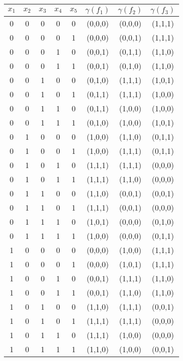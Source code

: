 \documentclass[utf8x, 14pt]{G7-32} %
\begin{document}
\begin{center}   
\begin{tabular} { | c | c | c | c | c | c | c | c | }
\hline
$x_1$ & $x_2$ & $x_3$ & $x_4$ & $x_5$ & $\gamma (f_1)$ & $\gamma (f_2)$ & $\gamma (f_3)$ \\
\hline\hline

0 & 0 & 0 & 0 & 0 & (0,0,0) & (0,0,0) & (1,1,1) \\
\hline
0 & 0 & 0 & 0 & 1 & (0,0,0) & (0,0,1) & (1,1,1) \\
\hline
0 & 0 & 0 & 1 & 0 & (0,0,1) & (0,1,1) & (1,1,0) \\
\hline
0 & 0 & 0 & 1 & 1 & (0,0,1) & (0,1,0) & (1,1,0) \\
\hline
0 & 0 & 1 & 0 & 0 & (0,1,0) & (1,1,1) & (1,0,1) \\
\hline
0 & 0 & 1 & 0 & 1 & (0,1,1) & (1,1,1) & (1,0,0) \\
\hline
0 & 0 & 1 & 1 & 0 & (0,1,1) & (1,0,0) & (1,0,0) \\
\hline
0 & 0 & 1 & 1 & 1 & (0,1,0) & (1,0,0) & (1,0,1) \\
\hline
0 & 1 & 0 & 0 & 0 & (1,0,0) & (1,1,0) & (0,1,1) \\
\hline
0 & 1 & 0 & 0 & 1 & (1,0,0) & (1,1,1) & (0,1,1) \\
\hline
0 & 1 & 0 & 1 & 0 & (1,1,1) & (1,1,1) & (0,0,0) \\
\hline
0 & 1 & 0 & 1 & 1 & (1,1,1) & (1,1,0) & (0,0,0) \\
\hline
0 & 1 & 1 & 0 & 0 & (1,1,0) & (0,0,1) & (0,0,1) \\
\hline
0 & 1 & 1 & 0 & 1 & (1,1,1) & (0,0,1) & (0,0,0) \\
\hline
0 & 1 & 1 & 1 & 0 & (1,0,1) & (0,0,0) & (0,1,0) \\
\hline
0 & 1 & 1 & 1 & 1 & (1,0,0) & (0,0,0) & (0,1,1) \\
\hline
1 & 0 & 0 & 0 & 0 & (0,0,0) & (1,0,0) & (1,1,1) \\
\hline
1 & 0 & 0 & 0 & 1 & (0,0,0) & (1,0,1) & (1,1,1) \\
\hline
1 & 0 & 0 & 1 & 0 & (0,0,1) & (1,1,1) & (1,1,0) \\
\hline
1 & 0 & 0 & 1 & 1 & (0,0,1) & (1,1,0) & (1,1,0) \\
\hline
1 & 0 & 1 & 0 & 0 & (1,1,0) & (1,1,1) & (0,0,1) \\
\hline
1 & 0 & 1 & 0 & 1 & (1,1,1) & (1,1,1) & (0,0,0) \\
\hline
1 & 0 & 1 & 1 & 0 & (1,1,1) & (1,0,0) & (0,0,0) \\
\hline
1 & 0 & 1 & 1 & 1 & (1,1,0) & (1,0,0) & (0,0,1) \\

\end{tabular}
\end{center}
\end{document}
